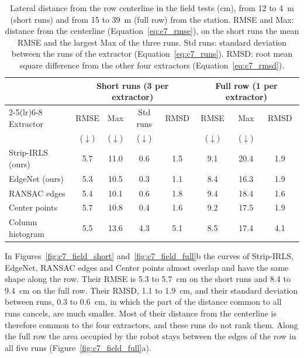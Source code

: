 \begin{table}[H]
    \centering
    \footnotesize
    \setlength{\tabcolsep}{4pt}
    \caption{Lateral distance from the row centerline in the field tests (cm), from 12 to 4~m (short runs) and from 15 to 39~m (full row) from the station. RMSE and Max: distance from the centerline (Equation~\eqref{eq:c7_rmse}), on the short runs the mean RMSE and the largest Max of the three runs. Std runs: standard deviation between the runs of the extractor (Equation~\eqref{eq:c7_runs}). RMSD: root mean square difference from the other four extractors (Equation~\eqref{eq:c7_rmsd}).}
    \label{tab:c7_field}
    \begin{tabular}{@{}lccccccc@{}}
        \toprule
        & \multicolumn{4}{c}{Short runs (3 per extractor)} & \multicolumn{3}{c}{Full row (1 per extractor)} \\
        \cmidrule(lr){2-5}\cmidrule(lr){6-8}
        Extractor & RMSE & Max & Std runs & RMSD & RMSE & Max & RMSD \\
         & ($\downarrow$) & ($\downarrow$) & ($\downarrow$) & & ($\downarrow$) & ($\downarrow$) & \\
        \midrule
        Strip-IRLS (ours) & 5.7 & 11.0 & 0.6 & 1.5 & 9.1 & 20.4 & 1.9 \\
        EdgeNet (ours) & 5.3 & 10.5 & 0.3 & 1.1 & 8.4 & 16.3 & 1.9 \\
        RANSAC edges & 5.4 & 10.1 & 0.6 & 1.8 & 9.4 & 18.4 & 1.6 \\
        Center points & 5.7 & 10.8 & 0.4 & 1.6 & 9.2 & 17.5 & 1.9 \\
        Column histogram & 5.5 & 13.6 & 4.3 & 5.1 & 8.5 & 17.4 & 4.1 \\
        \bottomrule
    \end{tabular}
\end{table}

In Figures~\ref{fig:c7_field_short} and~\ref{fig:c7_field_full}b the curves of Strip-IRLS, EdgeNet, RANSAC edges and Center points almost overlap and have the same shape along the row. Their RMSE is 5.3 to 5.7~cm on the short runs and 8.4 to 9.4~cm on the full row. Their RMSD, 1.1 to 1.9~cm, and their standard deviation between runs, 0.3 to 0.6~cm, in which the part of the distance common to all runs cancels, are much smaller. Most of their distance from the centerline is therefore common to the four extractors, and these runs do not rank them. Along the full row the area occupied by the robot stays between the edges of the row in all five runs (Figure~\ref{fig:c7_field_full}a).

